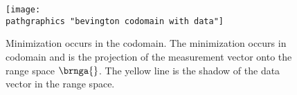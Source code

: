 \begin{figure}[t]
	\texttt{[image: \\pathgraphics "bevington codomain with data"]}
	\caption[Minimization occurs in the codomain]{Minimization occurs in the codomain. The minimization occurs in codomain and is the projection of the measurement vector onto the range space $\brnga{}$. The yellow line is the shadow of the data vector in the range space.}
	\label{fig:bevington codomain with data}
\end{figure}

\endinput  %


